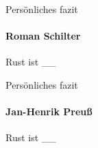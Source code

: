 \begin{frame}{Persönliches fazit}
    \framesubtitle{Roman Schilter}
    Rust ist \_\_
\end{frame}

\begin{frame}{Persönliches fazit}
    \framesubtitle{Jan-Henrik Preuß}
    Rust ist \_\_
\end{frame}

